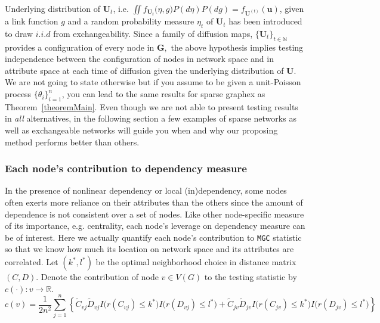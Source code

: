 \documentclass[12pt]{article}
\theoremstyle{definition}
\begin{document}
 Underlying distribution of $\mathbf{U}_{t}$, i.e. $\iint  f_{\mathbf{U}_t} \big( \eta, g \big) P(d \eta) P(dg) = f_{\mathbf{U}^{(t)} } (\mathbf{u})$, given a link function $g$ and a random probability measure $\eta_{t}$ of $\mathbf{U}_t$ has been introduced to draw $\textit{i.i.d}$ from exchangeability. Since a family of diffusion maps, $\{ \mathbf{U}_{t} \}_{t \in \mathbb{N}}$ provides a configuration of every node in $\mathbf{G},$ the above hypothesis implies testing independence between the configuration of nodes in network space and in attribute space at each time of diffusion given the underlying distribution of $\mathbf{U}$.	
We are not going to state otherwise but if you assume to be given a unit-Poisson process $\{ \theta_{i} \}_{i=1}^{n}$, you can lead to the same results for sparse graphex as Theorem~\ref{theoremMain}. Even though we are not able to present testing results in \textit{all} alternatives, in the following section a few examples of sparse networks as well as exchangeable networks will guide you when and why our proposing method performs better than others. 

\subsubsection{Each node's contribution to dependency measure}

In the presence of nonlinear dependency or local (in)dependency, some nodes often exerts more reliance on their attributes than the others since the amount of dependence is not consistent over a set of nodes. Like other node-specific measure of its importance, e.g. centrality, each node's leverage on dependency measure can be of interest. Here we actually quantify each node's contribution to \texttt{MGC} statistic so that we know how much its location on network space and its attributes are correlated.
Let $(k^{*}, l^{*})$ be the optimal neighborhood choice in distance matrix $(C, D)$.  Denote the contribution of node $v \in V(G)$ to the testing statistic by  $c(\cdot) : v \rightarrow \mathbb{R}$. 
\begin{equation}
\label{contribution}
c(v) = \frac{1}{2 n^2} \sum\limits_{j=1}^{n} \left\{     \tilde{C}_{v j} \tilde{D}_{v j} I \big(  r (C_{v j}) \leq k^{*}  \big) I \big( r (D_{ v j }) \leq l^{*} \big) + \tilde{C}_{j v} \tilde{D}_{j v} I \big(  r (C_{j v}) \leq k^{*}  \big) I \big( r (D_{j v}) \leq l^{*} \big) \right\} 
\end{equation}

\end{document}
